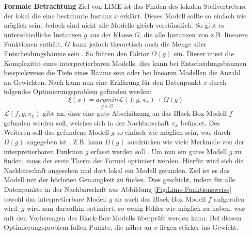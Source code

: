\textbf{Formale Betrachtung}
Ziel von LIME ist das Finden des lokalen Stellvertreters, der lokal die eine bestimmte Instanz $x$ erklärt. Dieses Modell sollte so einfach wie möglich sein. Jedoch sind nicht alle Modelle gleich verständlich. So gibt es unterschiedliche Instanzen $g$ aus der Klasse $G$, die alle Instanzen von z.B. linearen Funktionen enthält. $G$ kann jedoch theoretisch auch die Menge aller Entscheidungsbäume sein \cite{ribeiro2016should}. So führen \textcite{ribeiro2016should} den Faktor  $\Omega(g)$ ein. Dieser misst die Komplexität eines interpretierbaren Modells, dies kann bei Entscheidungsbäumen beispielsweise die Tiefe eines Baums sein oder bei linearen Modellen die Anzahl an Gewichten. Nach \textcite{ribeiro2016should} kann nun eine Erklärung für den Datenpunkt $x$ durch folgendes Optimierungsproblem gefunden werden:
\begin{equation}
    \xi(x) = \underset{g \in G}{argmin} \mathcal{L}(f, g, \pi_{x}) + \Omega(g)
\end{equation}
$\mathcal{L}(f, g, \pi_{x})$ gibt an, dass eine gute Abschätzung an das Black-Box-Modell $f$ gefunden werden soll, welches sich in der Nachbarschaft $\pi_{x}$ befindet. Des Weiteren soll das gefundene Modell $g$ so einfach wie möglich sein, was durch $\Omega(g)$ angegeben ist \cite{ribeiro2016should}. Z.B. kann $\Omega(g)$ ausdrücken wie viele Merkmale von der interpretierbaren Funktion $g$ erfasst werden soll \cite{molnar2022}.
Um nun ein gutes Modell $g$ zu finden, muss der erste Therm der Formel optimiert werden. Hierfür wird sich die Nachbarschaft angesehen und dort lokal ein Modell gefunden. Ziel ist es das Modell mit der höchsten Genauigkeit zu finden. Dies geschicht, indem für alle Datenpunkte in der Nachbarschaft aus Abbildung \ref{Fig:Lime-Funktionsweise} sowohl das interpretierbare Modell $g$ als auch das Black-Box Modell $f$ aufgerufen wird. $g$ wird nun daraufhin optimiert, so wenig Fehler wie möglich zu haben, was mit den Vorhersagen des Black-Box-Modells überprüft werden kann. Bei diesem Optimierungsproblem fallen Punkte, die näher an $x$ liegen stärker ins Gewicht. 

